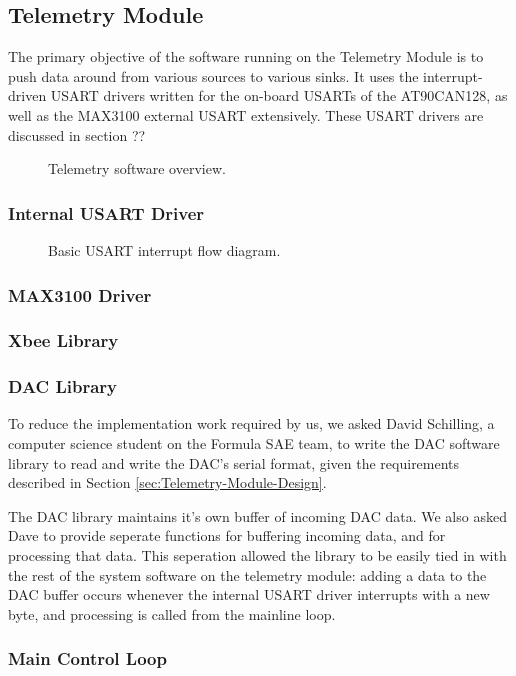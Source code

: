 \subsection{Telemetry Module}

The primary objective of the software running on the Telemetry Module is to push data around from various sources to various sinks. It uses the interrupt-driven USART drivers written for the on-board USARTs of the AT90CAN128, as well as the MAX3100 external USART extensively. These USART drivers are discussed in section ?? 

\begin{figure}[H]
\centering

\caption{Telemetry software overview.}
\label{fig:telemetry_software_implementation}
\end{figure}

\subsubsection{Internal USART Driver}

\begin{figure}[]
\centering

\caption{Basic USART interrupt flow diagram.}
\label{fig:usart_driver_flow}
\end{figure}


\subsubsection{MAX3100 Driver}


\subsubsection{Xbee Library}


\subsubsection{DAC Library}



To reduce the implementation work required by us, we asked David Schilling, a computer science student on the Formula SAE team, to write the DAC software library to read and write the DAC's serial format, given the requirements described in Section \ref{sec:Telemetry-Module-Design}.

The DAC library maintains it's own buffer of incoming DAC data. We also asked Dave to provide seperate functions for buffering incoming data, and for processing that data. This seperation allowed the library to be easily tied in with the rest of the system software on the telemetry module: adding a data to the DAC buffer occurs whenever the internal USART driver interrupts with a new byte, and processing is called from the mainline loop.

\subsubsection{Main Control Loop}